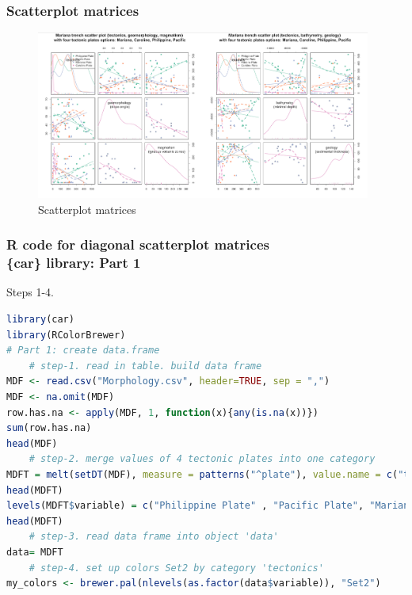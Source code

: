 \documentclass[pdflatex,compress,10pt,
	xcolor={dvipsnames,dvipsnames,svgnames,x11names,table},
	hyperref={colorlinks = true,breaklinks = true, urlcolor = NavyBlue, breaklinks = true}]{beamer}
\begin{document}
\begin{frame}\frametitle{Scatterplot matrices}
\begin{figure}[H]
	\centering
		\includegraphics[width=11cm]{Fig-4-4.jpg}
	\caption{Scatterplot matrices}
\end{figure}		
\end{frame}

\begin{frame}[fragile]\frametitle{R code for diagonal scatterplot matrices\\ \{car\} library: Part 1}
Steps 1-4. 
\begin{lstlisting}[language=R]
library(car)
library(RColorBrewer)
# Part 1: create data.frame
	# step-1. read in table. build data frame
MDF <- read.csv("Morphology.csv", header=TRUE, sep = ",")
MDF <- na.omit(MDF) 
row.has.na <- apply(MDF, 1, function(x){any(is.na(x))}) 
sum(row.has.na) 
head(MDF) 
	# step-2. merge values of 4 tectonic plates into one category
MDFT = melt(setDT(MDF), measure = patterns("^plate"), value.name = c("tectonics"))
head(MDFT)
levels(MDFT$variable) = c("Philippine Plate" , "Pacific Plate", "Mariana Plate", "Caroline Plate") # rename values
head(MDFT)
	# step-3. read data frame into object 'data'
data= MDFT 
	# step-4. set up colors Set2 by category 'tectonics'
my_colors <- brewer.pal(nlevels(as.factor(data$variable)), "Set2")
\end{lstlisting}		
\end{frame}
\end{document}
